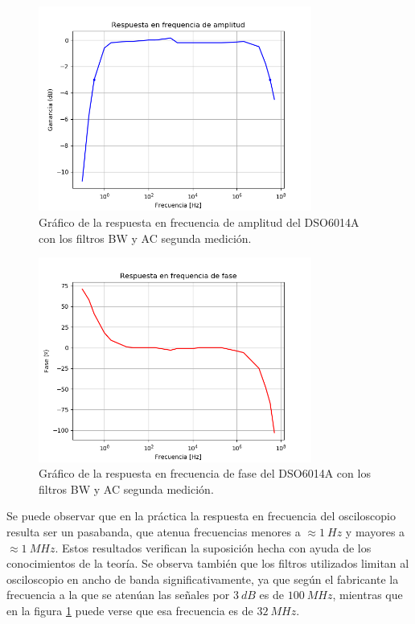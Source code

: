 \documentclass[a4paper]{article}
\begin{document}
\begin{figure}[H]
	\centering
	\includegraphics[width=0.8\textwidth]{resp_freq_osci1.png}
	\caption{Gráfico de la respuesta en frecuencia de amplitud del DSO6014A con los filtros BW y AC segunda medición.}  
	\label{graf:resp_freq_osci1}
\end{figure}

\begin{figure}[H]
	\centering
	\includegraphics[width=0.8\textwidth]{resp_freq_osci2.png}
	\caption{Gráfico de la respuesta en frecuencia de fase del DSO6014A con los filtros BW y AC segunda medición.} 
	\label{graf:resp_freq_osci2}
\end{figure}

Se puede observar que en la práctica la respuesta en frecuencia del osciloscopio resulta ser un pasabanda, que atenua frecuencias menores a $\approx 1 \ Hz$ y mayores a $\approx 1 \ MHz$. Estos resultados verifican la suposición hecha con ayuda de los conocimientos de la teoría. Se observa también que los filtros utilizados limitan al osciloscopio en ancho de banda significativamente, ya que según el fabricante la frecuencia a la que se atenúan las señales por $3 \ dB$ es de $100 \ MHz$, mientras que en la figura \ref{graf:resp_freq_osci1} puede verse que esa frecuencia es de $32 \ MHz$.
\end{document}
